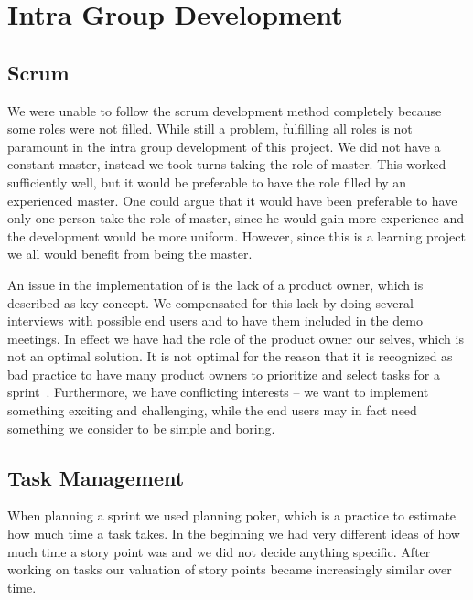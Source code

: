 \section{Intra Group Development}
\label{sec:intragroupdev}

\subsection{Scrum}
We were unable to follow the scrum development method completely because some roles were not filled.
While still a problem, fulfilling all roles is not paramount in the intra group development of this project.
We did not have a constant \scrum{} master, instead we took turns taking the role of \scrum{} master.
This worked sufficiently well, but it would be preferable to have the role filled by an experienced \scrum{} master.
One could argue that it would have been preferable to have only one person take the role of \scrum{} master, since he would gain more experience and the development would be more uniform.
However, since this is a learning project we all would benefit from being the \scrum{} master.

An issue in the implementation of \sos{} is the lack of a product owner, which is described as key concept. 
We compensated for this lack by doing several interviews with possible end users and to have them included in the demo meetings. 
In effect we have had the role of the product owner our selves, which is not an optimal solution. 
It is not optimal for the reason that it is recognized as bad \scrum{} practice to have many product owners to prioritize and select tasks for a sprint~\cite[p.~128]{Larman04}. 
Furthermore, we have conflicting interests -- we want to implement something exciting and challenging, while the end users may in fact need something we consider to be simple and boring.



\subsection{Task Management}
When planning a sprint we used planning poker, which is a \scrum{} practice to estimate how much time a task takes. 
In the beginning we had very different ideas of how much time a story point was and we did not decide anything specific. 
After working on tasks our valuation of story points became increasingly similar over time.

